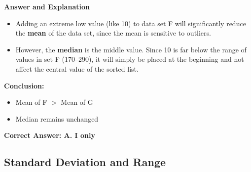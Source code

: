 \documentclass{beamer}
\begin{document}
\begin{frame}{\textbf{Answer and Explanation}}
\begin{itemize}
    \item Adding an extreme low value (like 10) to data set F will significantly reduce the \textbf{mean} of the data set, since the mean is sensitive to outliers.
    \item However, the \textbf{median} is the middle value. Since 10 is far below the range of values in set F (170–290), it will simply be placed at the beginning and not affect the central value of the sorted list.
\end{itemize}

\textbf{Conclusion:}
\begin{itemize}
    \item Mean of F $>$ Mean of G
    \item Median remains unchanged
\end{itemize}

\textbf{Correct Answer: A. I only}
\end{frame}









\begin{frame}
\section{ Standard Deviation and Range}
\end{frame}
\end{document}
